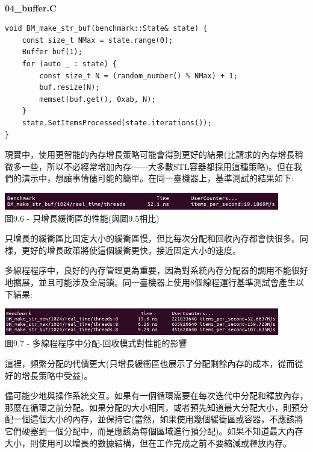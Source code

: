 \hspace*{\fill} \\ %
\noindent
\textbf{04\_buffer.C}
\begin{lstlisting}[style=styleCXX]
void BM_make_str_buf(benchmark::State& state) {
	const size_t NMax = state.range(0);
	Buffer buf(1);
	for (auto _ : state) {
		const size_t N = (random_number() % NMax) + 1;     
		buf.resize(N);
		memset(buf.get(), 0xab, N);
	}
	state.SetItemsProcessed(state.iterations());
}
\end{lstlisting}

現實中，使用更智能的內存增長策略可能會得到更好的結果(比請求的內存增長稍微多一些，所以不必經常增加內存——大多數STL容器都採用這種策略)。但在我們的演示中，想讓事情儘可能的簡單。在同一臺機器上，基準測試的結果如下:

\begin{center}
\includegraphics[width=0.9\textwidth]{content/3/chapter9/images/6.jpg}\\
圖9.6 - 只增長緩衝區的性能(與圖9.5相比)
\end{center}

只增長的緩衝區比固定大小的緩衝區慢，但比每次分配和回收內存都會快很多。同樣，更好的增長政策將使這個緩衝更快，接近固定大小的速度。 

多線程程序中，良好的內存管理更為重要，因為對系統內存分配器的調用不能很好地擴展，並且可能涉及全局鎖。同一臺機器上使用8個線程運行基準測試會產生以下結果:

\begin{center}
\includegraphics[width=0.9\textwidth]{content/3/chapter9/images/7.jpg}\\
圖9.7 - 多線程程序中分配-回收模式對性能的影響
\end{center}

這裡，頻繁分配的代價更大(只增長緩衝區也展示了分配剩餘內存的成本，從而從好的增長策略中受益)。 

儘可能少地與操作系統交互。如果有一個循環需要在每次迭代中分配和釋放內存，那麼在循環之前分配。如果分配的大小相同，或者預先知道最大分配大小，則預分配一個這個大小的內存，並保持它(當然，如果使用幾個緩衝區或容器，不應該將它們硬塞到一個分配中，而是應該為每個區域進行預分配)。如果不知道最大內存大小，則使用可以增長的數據結構，但在工作完成之前不要縮減或釋放內存。 

